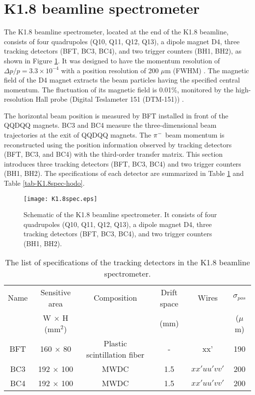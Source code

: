 \section{K1.8 beamline spectrometer}
\label{sec-k18beamspec}

The K1.8 beamline spectrometer, located at the end of the K1.8 beamline, consists of four quadrupoles (Q10, Q11, Q12, Q13), a dipole magnet D4, three tracking detectors (BFT, BC3, BC4), and two trigger counters (BH1, BH2), as shown in Figure \ref{fig-K1.8spec}. It was designed to have the momentum resolution of $\Delta p/p = 3.3\times10^{-4}$ with a position resolution of 200 $\mu$m (FWHM) \cite{K1.8}. The magnetic field of the D4 magnet extracts the beam particles having the specified central momentum. The fluctuation of its magnetic field is 0.01\%, monitored by the high-resolution Hall probe (Digital Teslameter 151 (DTM-151)) \cite{DTM-151}.

The horizontal beam position is measured by BFT installed in front of the QQDQQ magnets. BC3 and BC4 measure the three-dimensional beam trajectories at the exit of QQDQQ magnets. The $\pi^{-}$ beam momentum is reconstructed using the position information observed by tracking detectors (BFT, BC3, and BC4) with the third-order transfer matrix. This section introduces three tracking detectors (BFT, BC3, BC4) and two trigger counters (BH1, BH2). The specifications of each detector are summarized in Table \ref{tab-K1.8spec-tracker} and Table \ref{tab-K1.8spec-hodo}.

\begin{figure}[!h]
 \begin{center}
   \texttt{[image: K1.8spec.eps]}
   \caption{Schematic of the K1.8 beamline spectrometer. It consists of four quadrupoles (Q10, Q11, Q12, Q13), a dipole magnet D4, three tracking detectors (BFT, BC3, BC4), and two trigger counters (BH1, BH2).}
   \label{fig-K1.8spec}
 \end{center}
\end{figure}

\begin{table}[h]
  \begin{center}
    \caption{The list of specifications of the tracking detectors in the K1.8 beamline spectrometer.}
    \begin{tabular}{cccccc} 
      Name & Sensitive area & Composition & Drift space & Wires & $\sigma_{pos}$\\
       & W $\times$ H (mm$^2$) & & (mm) & & ($\mu$m) \\ \hline \hline
      BFT & 160 $\times$ 80 & Plastic scintillation fiber & - & xx' & 190 \\
      BC3 & 192 $\times$ 100 & MWDC & 1.5 & $xx'uu'vv'$ & 200  \\ 
      BC4 & 192 $\times$ 100 & MWDC & 1.5 & $xx'uu'vv'$ & 200 \\ 
   \end{tabular}
   \label{tab-K1.8spec-tracker}
   \end{center}
\end{table}

